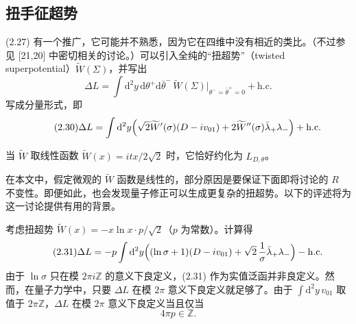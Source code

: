 \label{op:13}

\subsection*{扭手征超势}


(2.27) 有一个推广，它可能并不熟悉，因为它在四维中没有相近的类比。（不过参见 [21,20] 中密切相关的讨论。）可以引入全纯的“扭超势”（twisted superpotential）$\widetilde W(\Sigma)$，并写出
\begin{equation}\tag{2.29}
\Delta L=\int \mathrm{d}^{2}y\,\mathrm{d}\theta^+\mathrm{d}\bar\theta^-\,\widetilde W(\Sigma)\big|_{\theta^-=\bar\theta^+=0}+\mathrm{h.c.}
\end{equation}
写成分量形式，即
\begin{equation}\tag{2.30}
\Delta L=\int \mathrm{d}^{2}y\Bigl(\sqrt{2}\widetilde W'(\sigma)(D-iv_{01})+2\widetilde W''(\sigma)\bar\lambda_+\lambda_-\Bigr)+\mathrm{h.c.}
\end{equation}


当 $\widetilde W$ 取线性函数 $\widetilde W(x)=itx/2\sqrt2$ 时，它恰好约化为 $L_{D,\theta}$。

在本文中，假定微观的 $\widetilde W$ 函数是线性的，部分原因是要保证下面即将讨论的 $R$ 不变性。即便如此，也会发现量子修正可以生成更复杂的扭超势。以下的评述将为这一讨论提供有用的背景。

考虑扭超势 $\widetilde W(x)=-x\ln x\cdot p/\sqrt2$（$p$ 为常数）。计算得
\begin{equation}\tag{2.31}
\Delta L=-p\int \mathrm{d}^{2}y\Bigl((\ln\sigma+1)(D-iv_{01})+\sqrt{2}\,\frac{1}{\sigma}\bar\lambda_+\lambda_-\Bigr)-\mathrm{h.c.}
\end{equation}
由于 $\ln\sigma$ 只在模 $2\pi i\mathbb{Z}$ 的意义下良定义，(2.31) 作为实值泛函并非良定义。然而，在量子力学中，只要 $\Delta L$ 在模 $2\pi$ 意义下良定义就足够了。由于 $\int \mathrm{d}^{2}y\,v_{01}$ 取值于 $2\pi\mathbb{Z}$，$\Delta L$ 在模 $2\pi$ 意义下良定义当且仅当
\begin{equation}\tag{2.32}
4\pi p\in\mathbb{Z}.
\end{equation}

